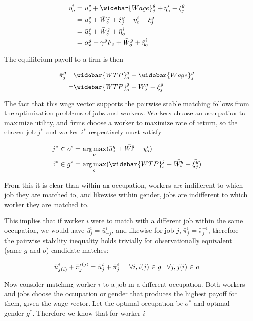\documentclass[11pt]{article}
\DeclareMathOperator*{\argmax}{arg\,max}
\begin{document}
\begin{align} \label{utility}
\bar{u}^i_o &= \bar{u}^{g}_o + \widebar{Wage}^g_j   + \bar{\eta}^i_o - \bar{\xi}^g_j  \\ \nonumber
&= \bar{u}^{g}_o +  \bar{W}^g_o + \bar{\xi}^g_j  + \bar{\eta}^i_o - \bar{\xi}^g_j  \\ \nonumber
&=  \bar{u}^{g}_o + \bar{W}^g_o  + \bar{\eta}^i_o  \\ \nonumber
&=  \alpha^g_o + \gamma^g F_o + \bar{W}^g_o  + \bar{\eta}^i_o 
\end{align}

The equilibrium payoff to a firm is then

\begin{align}
  \bar{\pi}^g_j =& \widebar{WTP}^g_o - \widebar{Wage}^g_j \\ \nonumber
  =& \widebar{WTP}^g_o -  \bar{W}^g_o - \bar{\xi}^g_j
\end{align}

The fact that this wage vector supports the pairwise stable matching follows from the optimization problems of jobs and workers. Workers choose an occupation to maximize utility, and firms choose a worker to maximize rate of return, so the chosen job $j^*$ and worker $i^*$ respectively must satisfy

\begin{align*}
j^* \in o^* &= \argmax_o ( \bar{u}^{g}_o + \bar{W^g_o}   + \eta^i_o ) \\
i^* \in g^* &= \argmax_g (\widebar{WTP}^g_o -  \bar{W^g_o} - \bar{\xi^g_j})
\end{align*}

From this it is clear than within an occupation, workers are indifferent to which job they are matched to, and likewise within gender, jobs are indifferent to which worker they are matched to.

This implies that if worker $i$ were to match with a different job within the same occupation, we would have $\bar{u}^{i}_j =\bar{u}^{i}_{-j}$, and likewise for job $j$, $\bar{\pi}^{i}_j = \bar{\pi}^{-i}_j $, therefore the pairwise stability inequality holds trivially for observationally equivalent (same $g$ and $o$) candidate matches:

$$\bar{u}^{i}_{j(i)}+ \bar{\pi}^{i(j)}_j = \bar{u}^{i}_{j} + \bar{\pi}^{i}_j \hspace{5mm} \forall i,i(j) \in g \hspace{3mm} \forall j,j(i) \in o$$

Now consider matching worker $i$ to a job in a different occupation. Both workers and jobs choose the occupation or gender that produces the highest payoff for them, given the wage vector. Let the optimal occupation be $o^*$ and optimal gender $g^*$. Therefore we know that for worker $i$
\end{document}
